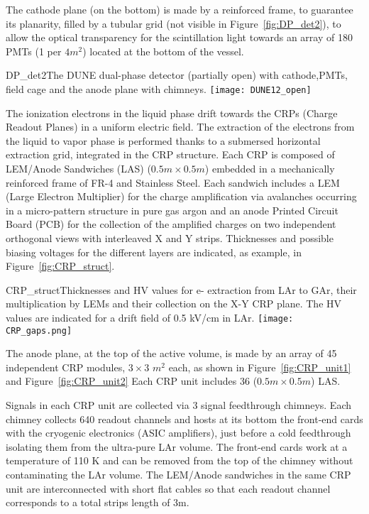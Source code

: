 The cathode plane (on the bottom) is made by a reinforced frame, to
guarantee its planarity, filled by a tubular grid (not visible in
Figure~\ref{fig:DP_det2}), to allow the optical transparency for the
scintillation light towards an array of 180 PMTs (1 per $4m^2$)
located at the bottom of the vessel.
\begin{cdrfigure}{DP_det2}{The DUNE dual-phase detector (partially open) with cathode,PMTs, field cage and the anode plane with chimneys.}
\texttt{[image: DUNE12\_open]}
\end{cdrfigure}

The ionization electrons in the liquid phase drift towards the CRPs
(Charge Readout Planes) in a uniform electric field. The extraction of
the electrons from the liquid to vapor phase is performed thanks to a
submersed horizontal extraction grid, integrated in the CRP structure.
Each CRP is composed of LEM/Anode Sandwiches (LAS) ($0.5m\times 0.5m$)
embedded in a mechanically reinforced frame of FR-4 and Stainless
Steel.  Each sandwich includes a LEM (Large Electron Multiplier) for
the charge amplification via avalanches occurring in a micro-pattern
structure in pure gas argon and an anode Printed Circuit Board (PCB)
for the collection of the amplified charges on two independent
orthogonal views with interleaved X and Y strips.  Thicknesses and
possible biasing voltages for the different layers are indicated, as
example, in Figure~\ref{fig:CRP_struct}.

\begin{cdrfigure}{CRP_struct}{Thicknesses and HV values for e- extraction from LAr to GAr, their multiplication by LEMs and their collection on the X-Y CRP plane. The HV values are indicated for a drift field of 0.5 kV/cm in LAr.}
\texttt{[image: CRP\_gaps.png]}
\end{cdrfigure}

The anode plane, at the top of the active volume, is made by an array
of 45 independent CRP modules, $3\times3$ $m^2$ each, as shown in
Figure~\ref{fig:CRP_unit1} and Figure~\ref{fig:CRP_unit2} Each CRP
unit includes 36 ($0.5m\times 0.5m$) LAS.

Signals in each CRP unit are collected via 3 signal feedthrough
chimneys. Each chimney collects 640 readout channels and hosts at its
bottom the front-end cards with the cryogenic electronics (ASIC
amplifiers), just before a cold feedthrough isolating them from the
ultra-pure LAr volume. The front-end cards work at a temperature of
110 K and can be removed from the top of the chimney without
contaminating the LAr volume. The LEM/Anode sandwiches in the same CRP
unit are interconnected with short flat cables so that each readout
channel corresponds to a total strips length of 3m.
  
